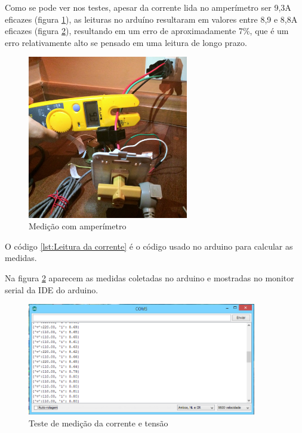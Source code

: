 Como se pode ver nos testes, apesar da corrente lida no amperímetro ser 9,3A eficazes (figura \ref{fig:teste-amperimetro}), as leituras no arduíno resultaram em valores entre 8,9 e 8,8A eficazes (figura \ref{fig:teste-medicao-corrente-voltagem}), resultando em um erro de aproximadamente 7\%, que é um erro relativamente alto se pensado em uma leitura de longo prazo.

\begin{figure}[H]
\centering
\includegraphics[width=7cm,keepaspectratio]{figuras/ferro-passar-amp.jpg} 
\caption{\label{fig:teste-amperimetro} Medição com amperímetro}
\end{figure}

O código \ref{lst:Leitura da corrente} é o código usado no arduino para calcular as medidas.



Na figura \ref{fig:teste-medicao-corrente-voltagem} aparecem as medidas coletadas no arduino e mostradas no monitor serial da IDE do arduino.

\begin{figure}[H]
\centering
\includegraphics[width=10cm,keepaspectratio]{figuras/ferro-passar.png} 
\caption{\label{fig:teste-medicao-corrente-voltagem} Teste de medição da corrente e tensão}
\end{figure}

